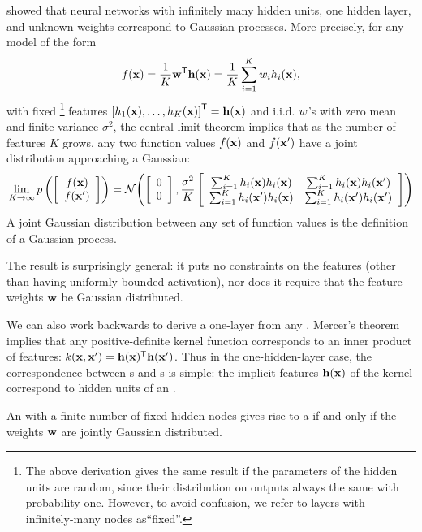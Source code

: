 \citet[chapter 2]{neal1995bayesian} showed that neural networks with infinitely many hidden units, one hidden layer, and unknown weights correspond to Gaussian processes.
More precisely, for any model of the form
%
\begin{align}
f({\bf{x}}) = \frac{1}{K}{\mathbf {{\bf{w}}}}^{\mathsf{T}} {\bf{h}}({\bf{x}}) = \frac{1}{K} \sum_{i=1}^K w_i h_i({\bf{x}}),
\label{eq:one-layer-gp}
\end{align}
%
with fixed%
\footnote{The above derivation gives the same result if the parameters of the hidden units are random, since their distribution on outputs always the same with probability one.
However, to avoid confusion, we refer to layers with infinitely-many nodes as``fixed''.
}
 features $\left[ h_1({\bf{x}}), \dots, h_K({\bf{x}}) \right]^{\mathsf{T}} = {\bf{h}}({\bf{x}})$ and i.i.d. $w$'s with zero mean and finite variance $\sigma^2$, the central limit theorem implies that as the number of features $K$ grows, any two function values $f({\bf{x}})$ and $f({\bf{x}}')$ have a joint distribution approaching a Gaussian:
%
\begin{align}
\lim_{K \to \infty} p\left( \left[ \begin{array}{c} {f({\bf{x}})} \\ {f({\bf{x}}')} \end{array} \right] \right) = \mathcal{N}\!\left(\left[ \begin{array}{c} {0} \\ {0} \end{array} \right],
\frac{\sigma^2}{K} \left[ \begin{array}{cc}
\sum_{i=1}^K h_i({\bf{x}})h_i({\bf{x}}) &
\sum_{i=1}^K h_i({\bf{x}})h_i({\bf{x}}') \\
\sum_{i=1}^K h_i({\bf{x}}')h_i({\bf{x}}) &
\sum_{i=1}^K h_i({\bf{x}}')h_i({\bf{x}}')
\end{array} \right] \right)
\end{align}
A joint Gaussian distribution between any set of function values is the definition of a Gaussian process.

The result is surprisingly general:
it puts no constraints on the features (other than having uniformly bounded activation), nor does it require that the feature weights ${\bf{w}}$ be Gaussian distributed.  

We can also work backwards to derive a one-layer \MLP{} from any \gp{}.
Mercer's theorem implies that any positive-definite kernel function corresponds to an inner product of features: $k({\bf{x}}, {\bf{x}}') = {\bf{h}}({\bf{x}}) ^{\mathsf{T}} {\bf{h}}({\bf{x}}')$.
%
Thus in the one-hidden-layer case, the correspondence between \MLP{}s and \gp{}s is simple:
the implicit features ${\bf{h}}({\bf{x}})$ of the kernel correspond to hidden units of an \MLP{}.

An \MLP{} with a finite number of fixed hidden nodes gives rise to a \gp{} if and only if the weights ${\bf{w}}$ are jointly Gaussian distributed.



